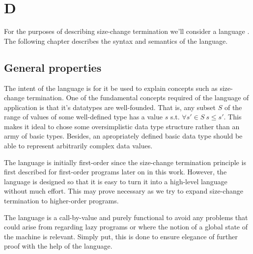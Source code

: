 \newcommand{\D}{D}
\chapter{\D}

For the purposes of describing size-change termination we'll consider a language
. The following chapter describes the syntax and semantics of the
language.

\section{General properties}

The intent of the language is for it be used to explain concepts such as
size-change termination. One of the fundamental concepts required of the
language of application is that it's datatypes are well-founded. That is, any
subset $S$ of the range of values of some well-defined type has a value $s$
s.t. $\forall {s'\in S}\ s\leq s'$. This makes it ideal to chose some
oversimplistic data type structure rather than an army of basic types. Besides,
an apropriately defined basic data type should be able to represent arbitrarily
complex data values.

The language is initially first-order since the size-change termination
principle is first described for first-order programs later on in this work.
However, the language is designed so that it is easy to turn it into a
high-level language without much effort. This may prove necessary as we try to
expand size-change termination to higher-order programs.

The language is a call-by-value and purely functional to avoid any problems
that could arise from regarding lazy programs or where the notion of a global
state of the machine is relevant. Simply put, this is done to ensure elegance
of further proof with the help of the language.







